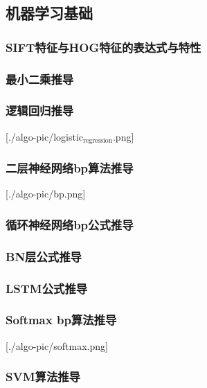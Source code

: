 \documentclass[11pt]{article}
\begin{document}
\subsection{机器学习基础}
\label{sec-6-3}

\subsubsection{SIFT特征与HOG特征的表达式与特性}
\label{sec-6-3-1}

\subsubsection{最小二乘推导}
\label{sec-6-3-2}

\subsubsection{逻辑回归推导}
\label{sec-6-3-3}

[./algo-pic/logistic$_{\text{regression}}$.png]

\subsubsection{二层神经网络bp算法推导}
\label{sec-6-3-4}

[./algo-pic/bp.png]

\subsubsection{循环神经网络bp公式推导}
\label{sec-6-3-5}

\subsubsection{BN层公式推导}
\label{sec-6-3-6}

\subsubsection{LSTM公式推导}
\label{sec-6-3-7}

\subsubsection{Softmax bp算法推导}
\label{sec-6-3-8}

[./algo-pic/softmax.png]

\subsubsection{SVM算法推导}
\label{sec-6-3-9}
\end{document}
